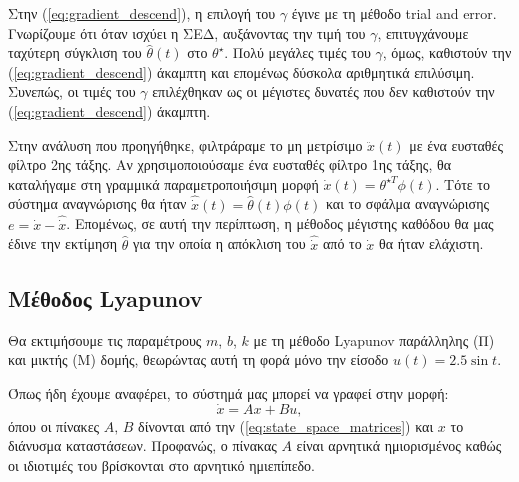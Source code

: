 \documentclass[a4paper,12pt]{article}
\begin{document}
Στην (\ref{eq:gradient_descend}), η επιλογή του $\gamma$ έγινε με τη μέθοδο trial and 
error. Γνωρίζουμε ότι όταν ισχύει η ΣΕΔ, αυξάνοντας την τιμή του $\gamma$, επιτυγχάνουμε 
ταχύτερη σύγκλιση του $\hat{\theta}(t)$ στο $\theta^{\star}$. Πολύ μεγάλες τιμές του $\gamma$, όμως, καθιστούν 
την (\ref{eq:gradient_descend}) άκαμπτη και επομένως δύσκολα αριθμητικά επιλύσιμη. Συνεπώς, οι τιμές του 
$\gamma$ επιλέχθηκαν ως οι μέγιστες δυνατές που δεν καθιστούν την (\ref{eq:gradient_descend}) άκαμπτη.

Στην ανάλυση που προηγήθηκε, φιλτράραμε το μη μετρίσιμο $\ddot{x}(t)$ με ένα ευσταθές φίλτρο 2ης τάξης. Αν 
χρησιμοποιούσαμε ένα ευσταθές φίλτρο 1ης τάξης, θα καταλήγαμε στη γραμμικά παραμετροποιήσιμη μορφή
$\dot{x}(t) = \theta^{\star T} \phi(t)$. Τότε το σύστημα αναγνώρισης θα ήταν 
$\hat{\dot{x}}(t) = \hat{\theta}(t)\phi(t)$ και το σφάλμα αναγνώρισης $e = \dot{x} - \hat{\dot{x}}$. 
Επομένως, σε αυτή την περίπτωση, η μέθοδος μέγιστης καθόδου θα μας έδινε την εκτίμηση $\hat{\theta}$ για την 
οποία η απόκλιση του $\hat{\dot{x}}$ από το $\dot{x}$ θα ήταν ελάχιστη.

\subsection*{Μέθοδος Lyapunov}
Θα εκτιμήσουμε τις παραμέτρους $m$, $b$, $k$ με τη μέθοδο Lyapunov
παράλληλης (Π) και μικτής (Μ) δομής, θεωρώντας αυτή τη φορά μόνο την είσοδο $u(t) = 2.5 \sin t$.

Όπως ήδη έχουμε αναφέρει, το σύστημά μας μπορεί να γραφεί στην μορφή:
\begin{equation*}
    \dot{x} = Ax + Bu,
\end{equation*}
όπου οι πίνακες $A, \, B$ δίνονται από την (\ref{eq:state_space_matrices}) και $x$ το διάνυσμα καταστάσεων.
Προφανώς, ο πίνακας $A$ είναι αρνητικά ημιορισμένος καθώς οι ιδιοτιμές του βρίσκονται στο αρνητικό ημιεπίπεδο.
\end{document}
